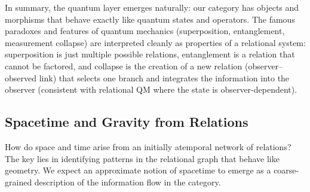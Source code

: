 \documentclass{article}
\begin{document}
In summary, the quantum layer emerges naturally: our category has objects and morphisms that behave exactly like quantum states and operators. The famous paradoxes and features of quantum mechanics (superposition, entanglement, measurement collapse) are interpreted cleanly as properties of a relational system: superposition is just multiple possible relations, entanglement is a relation that cannot be factored, and collapse is the creation of a new relation (observer–observed link) that selects one branch and integrates the information into the observer (consistent with relational QM where the state is observer-dependent\cite{rovelli1996}).

\subsection{Spacetime and Gravity from Relations}

How do space and time arise from an initially atemporal network of relations? The key lies in identifying patterns in the relational graph that behave like geometry. We expect an approximate notion of spacetime to emerge as a coarse-grained description of the information flow in the category.
\end{document}
